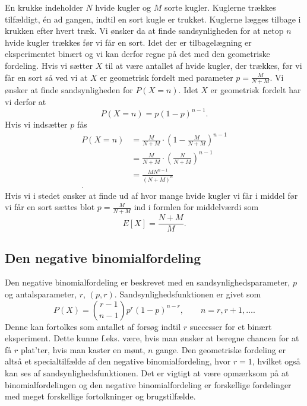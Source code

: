 \begin{eks}
  En krukke indeholder $N$ hvide kugler og $M$ sorte kugler. Kuglerne trækkes tilfældigt, én ad gangen, indtil en sort kugle er trukket. Kuglerne lægges tilbage i krukken efter hvert træk. Vi ønsker da at finde sandsynligheden for at netop $n$ hvide kugler trækkes før vi får en sort. Idet der er tilbagelægning er eksperimentet binært og vi kan derfor regne på det med den geometriske fordeling. Hvis vi sætter $X$ til at være antallet af hvide kugler, der trækkes, før vi får en sort så ved vi at $X$ er geometrisk fordelt med parameter $p = \frac{M}{N + M}$. Vi ønsker at finde sandsynligheden for $P(X = n)$. Idet $X$ er geometrisk fordelt har vi derfor at
  \[ 
  P(X = n) = p(1-p)^{n-1}
  .\]
  Hvis vi indsætter $p$ fås
  \begin{align*}
    P(X = n) &= \frac{M}{N + M}\cdot \left( 1 - \frac{M}{N+M} \right)^{n-1} \\
    &= \frac{M}{N + M}\cdot \left( \frac{N}{N + M} \right)^{n-1} \\
    &= \frac{MN^{n-1}}{(N + M)^n} \\
  .\end{align*}
  \vspace{12pt}
  Hvis vi i stedet ønsker at finde ud af hvor mange hvide kugler vi får i middel før vi får en sort sættes blot $p = \frac{M}{N + M}$ ind i formlen for middelværdi som
  \[ 
    E[X] = \frac{N + M}{M}
  .\]
\end{eks}

\subsection{Den negative binomialfordeling} \label{afs:fornegbin}
Den negative binomialfordeling er beskrevet med en sandsynlighedsparameter, $p$ og antalsparameter, $r$, $(p,r)$. Sandsynlighedsfunktionen er givet som
\[ 
  P(X) = \binom{r-1}{n-1} p^{r}(1-p)^{n-r}, \qquad n = r, r+1, \ldots 
.\]
Denne kan fortolkes som antallet af forsøg indtil $r$ successer for et binært eksperiment. Dette kunne f.eks. være, hvis man ønsker at beregne chancen for at få $r$ plat'ter, hvis man kaster en mønt, $n$ gange. Den geometriske fordeling er altså et specialtilfælde af den negative binomialfordeling, hvor $r = 1$, hvilket også kan ses af sandsynlighedsfunktionen. Det er vigtigt at være opmærksom på at binomialfordelingen og den negative binomialfordeling er forskellige fordelinger med meget forskellige fortolkninger og brugstilfælde. 

